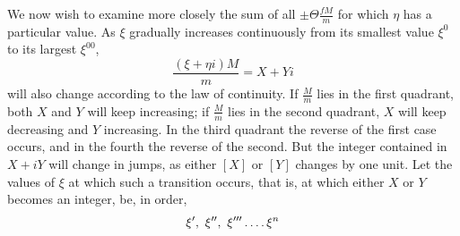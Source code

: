 We now wish to examine more closely the sum of all $\pm\Theta\frac{fM}{m}$ for which $\eta$ has a particular value. As $\xi$ gradually increases continuously from its smallest value $\xi^0$ to its largest $\xi^{00}$,
\[
\frac{(\xi+\eta i)M}{m}=X+Yi
\]
will also change according to the law of continuity. If $\frac{M}{m}$ lies in the first quadrant, both $X$ and $Y$ will keep increasing; if $\frac{M}{m}$ lies in the second quadrant, $X$ will keep decreasing and $Y$ increasing. In the third quadrant the reverse of the first case occurs, and in the fourth the reverse of the second. But the integer contained in $X+iY$ will change in jumps, as either $[X]$ or $[Y]$ changes by one unit. Let the values of $\xi$ at which such a transition occurs, that is, at which either $X$ or $Y$ becomes an integer, be, in order,
\[
\xi',\ \xi'',\ \xi'''\dotsfour\xi^n
\]

